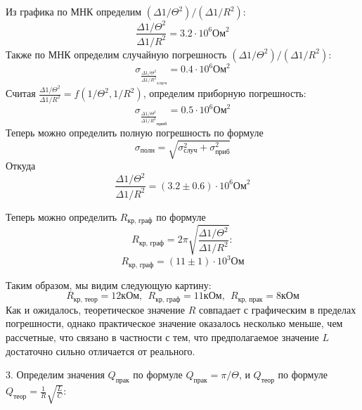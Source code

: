 \documentclass[14pt]{article}
\begin{document}
\vspace{1cm}

Из графика по МНК определим $(\Delta 1/\Theta^2)/(\Delta 1/R^2)$:
$$
	\frac{\Delta 1/\Theta^2}{\Delta 1/R^2} = 3.2 \cdot 10^6 \text{Ом}^2
$$
Также по МНК определим случайную погрешность $(\Delta 1/\Theta^2)/(\Delta 1/R^2)$:
$$
	\sigma_{\frac{\Delta 1/\Theta^2}{\Delta 1/R^2}_\text{случ}} = 0.4 \cdot 10^6 \text{Ом}^2
$$
Считая $\frac{\Delta 1/\Theta^2}{\Delta 1/R^2} = f(1/\Theta^2, 1/R^2)$, определим приборную погрешность:
$$
	\sigma_{\frac{\Delta 1/\Theta^2}{\Delta 1/R^2}_\text{приб}} = 0.5 \cdot 10^6 \text{Ом}^2
$$
Теперь можно определить полную погрешность по формуле
$$
	\sigma_{\text{полн}} = \sqrt{\sigma_{\text{случ}}^2 + \sigma_{\text{приб}}^2}
$$
Откуда
$$
	\frac{\Delta 1/\Theta^2}{\Delta 1/R^2} = (3.2 \pm 0.6) \cdot 10^6 \text{Ом}^2
$$

Теперь можно определить $R_{\text{кр, граф}}$ по формуле
$$
	R_{\text{кр, граф}} = 2\pi\sqrt{\frac{\Delta 1/\Theta^2}{\Delta 1/R^2}}:
$$
$$
	R_{\text{кр, граф}} = (11 \pm 1)\cdot10^3 \text{Ом}
$$

Таким образом, мы видим следующую картину:
$$	
	R_{\text{кр, теор}} = 12 \text{кОм},~~R_{\text{кр, граф}} = 11 \text{кОм},~~R_{\text{кр, прак}} = 8 \text{кОм}
$$
Как и ожидалось, теоретическое значение $R$ совпадает с графическим в пределах погрешности, однако практическое значение оказалось несколько меньше, чем рассчетные, что связано в частности с тем, что предполагаемое значение $L$ достаточно сильно отличается от реального.

\vspace{1cm}
3. Определим значения $Q_{\text{прак}}$ по формуле $Q_{\text{прак}} = \pi/\Theta$, и $Q_{\text{теор}}$ по формуле $Q_{\text{теор}} = \frac{1}{R}\sqrt{\frac{L}{C}}$:
\end{document}
